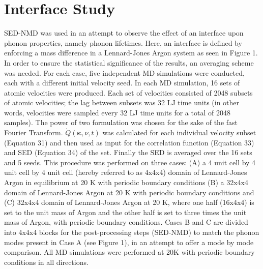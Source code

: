 \chapter{Interface Study}

SED-NMD was used in an attempt to observe the effect of an interface upon phonon properties, namely phonon lifetimes. Here, an interface is defined by enforcing a mass difference in a Lennard-Jones Argon system as seen in Figure 1. In order to ensure the statistical significance of the results, an averaging scheme was needed. For each case, five independent MD simulations were conducted, each with a different initial velocity seed. In each MD simulation, 16 sets of atomic velocities were produced. Each set of velocities consisted of 2048 subsets of atomic velocities; the lag between subsets was 32 LJ time units (in other words, velocities were sampled every 32 LJ time units for a total of 2048 samples). The power of two formulation was chosen for the sake of the fast Fourier Transform. $\dot{Q}(\bm{\kappa},\nu,t)$ was calculated for each individual velocity subset (Equation 31) and then used as input for the correlation function (Equation 33) and SED (Equation 34) of the set. Finally the SED is averaged over the 16 sets and 5 seeds. This procedure was performed on three cases: (A) a 4 unit cell by 4 unit cell by 4 unit cell (hereby referred to as 4x4x4) domain of Lennard-Jones Argon in equilibrium at 20 K with periodic boundary conditions (B) a 32x4x4 domain of Lennard-Jones Argon at 20 K with periodic boundary conditions and (C) 32x4x4 domain of Lennard-Jones Argon at 20 K, where one half (16x4x4) is set to the unit mass of Argon and the other half is set to three times the unit mass of Argon, with periodic boundary conditions. Cases B and C are divided into 4x4x4 blocks for the post-processing steps (SED-NMD) to match the phonon modes present in Case A (see Figure 1), in an attempt to offer a mode by mode comparison. All MD simulations were performed at 20K with periodic boundary conditions in all directions.

